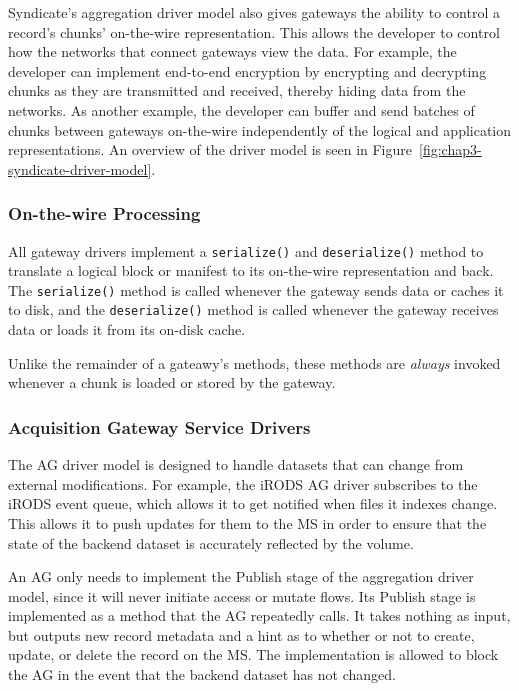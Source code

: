 Syndicate's aggregation driver model also gives gateways the ability to
control a record's chunks' on-the-wire representation.  This allows the
developer to control how the networks that connect gateways view the data.  For
example, the developer can implement end-to-end encryption by encrypting and
decrypting chunks as they are transmitted and received, thereby hiding
data from the networks.  As another example, the developer can buffer and send
batches of chunks between gateways on-the-wire independently of the logical and
application representations.  An overview of the driver model is seen in
Figure~\ref{fig:chap3-syndicate-driver-model}.

\subsubsection{On-the-wire Processing}

All gateway drivers implement a \texttt{serialize()} and \texttt{deserialize()}
method to translate a logical block or manifest to its on-the-wire
representation and back.  The \texttt{serialize()} method is called whenever the gateway sends
data or caches it to disk, and the \texttt{deserialize()} method is called
whenever the gateway receives data or loads it from its on-disk cache.

Unlike the remainder of a gateawy's methods, these methods are \emph{always}
invoked whenever a chunk is loaded or stored by the gateway.

\subsubsection{Acquisition Gateway Service Drivers}

The AG driver model is designed to handle datasets that can change from
external modifications.  For example, the iRODS AG driver
subscribes to the iRODS event queue, which allows it to get notified
when files it indexes change.  This allows it to push updates for them to the MS
in order to ensure that the state of the backend dataset is accurately reflected
by the volume.

 An AG only needs to implement the Publish stage of
the aggregation driver model, since it will never initiate access or mutate
flows.  Its Publish stage is implemented as a method that the AG repeatedly
calls.  It takes nothing as input, but outputs new record metadata and a
hint as to whether or not to create, update, or delete the record on the MS.  The
implementation is allowed to block the AG in the event that the backend dataset
has not changed.

